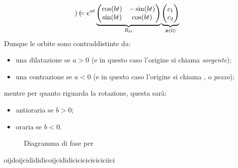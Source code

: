 {\[\begin{pmatrix}
        \end{pmatrix}= e^{at}\,\parentesi{R_{bt} }{%
            \begin{pmatrix}
                \cos(bt) & -\sin(bt)\\ 
            \sin(bt) & \cos(bt)
            \end{pmatrix}
        }\,\parentesi{\bm{x}(0)}{\begin{pmatrix}
            c_1\\c_2
        \end{pmatrix}}
    \]Dunque le orbite sono contraddistinte da: \begin{itemize}
        \item una dilatazione se $ a>0 $ (e in questo caso l'origine si chiama \emph{sorgente});
        \item una contrazione se $ a<0 $ (e in questo caso l'origine si chiama , o \emph{pozzo});
    \end{itemize}mentre per quanto riguarda la rotazione, questa sarà: \begin{itemize}
        \item antioraria se $ b>0 $;
        \item oraria se $ b<0 $.
    \end{itemize}
    \begin{figure}

        \caption{Diagramma di fase per }
    \end{figure}
}{oijdoijcidididicoijcididiciciciciciciciici}{}
